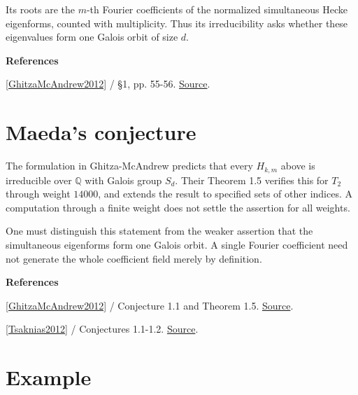 \documentclass[11pt,a4paper,oneside,openany]{book}
\newcommand{\atlasdisplay}[1]{\par\begingroup\centering\vspace{3pt}\noindent\adjustbox{max width=\linewidth}{\(\displaystyle #1\)}\par\vspace{5pt}\endgroup}
\newenvironment{sources}{\par\smallskip\begingroup\footnotesize\color{atlasgray}\leftskip=10pt\setlength{\parskip}{2pt}}{\par\endgroup\smallskip}
\begin{document}
\atlasdisplay{H_{k,m}(X)=\det(XI-T_m\mid S_k)\in\mathbb Z[X].}
\color{black} Its roots are the \(m\)-th Fourier coefficients of the normalized simultaneous Hecke eigenforms, counted with multiplicity. Thus its irreducibility asks whether these eigenvalues form one Galois orbit of size \(d\).\par
\begin{sources}
\textbf{References}\par\smallskip
\noindent\hyperlink{ref:GhitzaMcAndrew2012}{[GhitzaMcAndrew2012]} / §1, pp. 55-56.  \href{https://tcms.org.ge/Journals/ASETMJ/Volume5_2/Xpapers/tmj5_2_5.pdf}{Source}.\par
\end{sources}\color{black}
\section{Maeda's conjecture}
\color{black} The formulation in Ghitza-McAndrew predicts that every \(H_{k,m}\) above is irreducible over \(\mathbb Q\) with Galois group \(S_d\). Their Theorem 1.5 verifies this for \(T_2\) through weight \(14000\), and extends the result to specified sets of other indices. A computation through a finite weight does not settle the assertion for all weights.\par
\color{black} One must distinguish this statement from the weaker assertion that the simultaneous eigenforms form one Galois orbit. A single Fourier coefficient need not generate the whole coefficient field merely by definition.\par
\begin{sources}
\textbf{References}\par\smallskip
\noindent\hyperlink{ref:GhitzaMcAndrew2012}{[GhitzaMcAndrew2012]} / Conjecture 1.1 and Theorem 1.5.  \href{https://tcms.org.ge/Journals/ASETMJ/Volume5_2/Xpapers/tmj5_2_5.pdf}{Source}.\par
\noindent\hyperlink{ref:Tsaknias2012}{[Tsaknias2012]} / Conjectures 1.1-1.2.  \href{https://link.springer.com/chapter/10.1007/978-3-319-03847-6_12}{Source}.\par
\end{sources}\color{black}
\section{Example}
\end{document}
